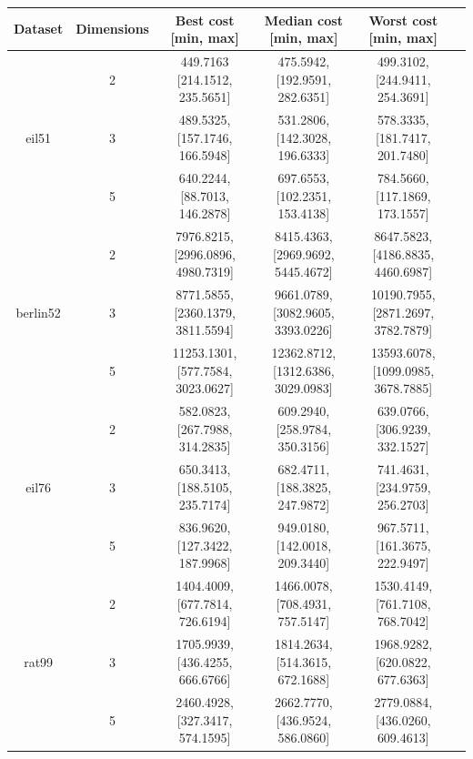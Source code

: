 \documentclass[conference]{IEEEtran}
\begin{document}
\begin{table}[h]
    \centering
    \begin{tabular}{|c|c|c|c|c|c|}
        \hline 
        Dataset & Dimensions & Best cost [min, max] & Median cost [min, max] & Worst cost [min, max] \\
        \hline
        & 2 & 449.7163 [214.1512, 235.5651] & 475.5942, [192.9591, 282.6351] & 499.3102, [244.9411, 254.3691] \\
        eil51 & 3 & 489.5325, [157.1746, 166.5948] & 531.2806, [142.3028, 196.6333] & 578.3335, [181.7417, 201.7480] \\
        & 5 & 640.2244, [88.7013, 146.2878] & 697.6553, [102.2351, 153.4138] & 784.5660, [117.1869, 173.1557] \\
        \hline
        & 2 & 7976.8215, [2996.0896, 4980.7319] & 8415.4363, [2969.9692, 5445.4672] & 8647.5823, [4186.8835, 4460.6987] \\
        berlin52 & 3 & 8771.5855, [2360.1379, 3811.5594] & 9661.0789, [3082.9605, 3393.0226] & 10190.7955, [2871.2697, 3782.7879] \\
        & 5 & 11253.1301, [577.7584, 3023.0627] & 12362.8712, [1312.6386, 3029.0983] & 13593.6078, [1099.0985, 3678.7885] \\
        \hline
        & 2 & 582.0823, [267.7988, 314.2835] & 609.2940, [258.9784, 350.3156] & 639.0766, [306.9239, 332.1527] \\
        eil76 & 3 & 650.3413, [188.5105, 235.7174] & 682.4711, [188.3825, 247.9872] & 741.4631, [234.9759, 256.2703] \\
        & 5 & 836.9620, [127.3422, 187.9968] & 949.0180, [142.0018, 209.3440] & 967.5711, [161.3675, 222.9497] \\
        \hline
        & 2 & 1404.4009, [677.7814, 726.6194] & 1466.0078, [708.4931, 757.5147] & 1530.4149, [761.7108, 768.7042] \\
        rat99 & 3 & 1705.9939, [436.4255, 666.6766] & 1814.2634, [514.3615, 672.1688] & 1968.9282, [620.0822, 677.6363] \\
        & 5 & 2460.4928, [327.3417, 574.1595] & 2662.7770, [436.9524, 586.0860] & 2779.0884, [436.0260, 609.4613] \\
        \hline
    \end{tabular}
     \label{Fitness results for the particle swarm optimisation algorithm}
\end{table}
\end{document}
